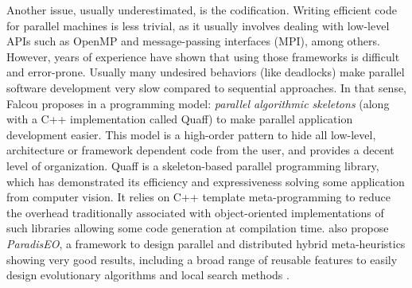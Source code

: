 
Another issue, usually underestimated, is the codification. Writing efficient code for parallel machines is less trivial, as it usually involves dealing with low-level APIs such as OpenMP and message-passing interfaces (MPI), among others. However, years of experience have shown that using those frameworks is difficult and error-prone. Usually many undesired behaviors (like deadlocks) make parallel software development very slow compared to sequential approaches. In that sense, Falcou proposes in \cite{Falcou2009} a programming model: \textit{parallel algorithmic skeletons} (along with a C++ implementation called {\sc Quaff}) to make parallel application development easier. This model is a high-order pattern to hide all low-level, architecture or framework dependent code from the user, and provides a decent level of organization. {\sc Quaff} is a skeleton-based parallel programming library, which has demonstrated its efficiency and expressiveness solving some application from computer vision. It relies on C++ template meta-programming to reduce the overhead traditionally associated with object-oriented implementations of such libraries allowing some code generation at compilation time.  also propose {\it ParadisEO}, a framework to design parallel and distributed hybrid meta-heuristics showing very good results, including a broad range of reusable features to easily design evolutionary algorithms and local search methods \cite{Cahon2004}.



